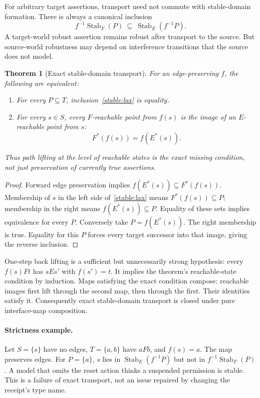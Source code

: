 \documentclass[11pt]{article}
\newtheorem{theorem}{Theorem}[section]
\newcommand{\Stab}{\operatorname{Stab}}
\begin{document}
For arbitrary target assertions, transport need not commute with stable-domain formation. There is always a canonical inclusion
\begin{equation}\label{stable:lax}
 f^{-1}\Stab_F(P)\ \subseteq\ \Stab_E(f^{-1}P).
\end{equation}
A target-world robust assertion remains robust after transport to the source. But source-world robustness may depend on interference transitions that the source does not model.

\begin{theorem}[Exact stable-domain transport]\label{stable:transport}
For an edge-preserving $f$, the following are equivalent:
\begin{enumerate}
\item For every $P\subseteq T$, inclusion~\eqref{stable:lax} is equality.
\item For every $s\in S$, every $F$-reachable point from $f(s)$ is the image of an $E$-reachable point from $s$:
\[
 F^*(f(s))=f(E^*(s)).
\]
\end{enumerate}
Thus path lifting at the level of reachable states is the exact missing condition, not just preservation of currently true assertions.
\end{theorem}
\begin{proof}
Forward edge preservation implies $f(E^*(s))\subseteq F^*(f(s))$. Membership of $s$ in the left side of~\eqref{stable:lax} means $F^*(f(s))\subseteq P$; membership in the right means $f(E^*(s))\subseteq P$. Equality of these sets implies equivalence for every $P$. Conversely take $P=f(E^*(s))$. The right membership is true. Equality for this $P$ forces every target successor into that image, giving the reverse inclusion.
\end{proof}

One-step back lifting is a sufficient but unnecessarily strong hypothesis: every $f(s)Ft$ has $sEs'$ with $f(s')=t$. It implies the theorem's reachable-state condition by induction. Maps satisfying the exact condition compose: reachable images first lift through the second map, then through the first. Their identities satisfy it. Consequently exact stable-domain transport is closed under pure interface-map composition.

\paragraph{Strictness example.} Let $S=\{s\}$ have no edges, $T=\{a,b\}$ have $aFb$, and $f(s)=a$. The map preserves edges. For $P=\{a\}$, $s$ lies in $\Stab_E(f^{-1}P)$ but not in $f^{-1}\Stab_F(P)$. A model that omits the reset action thinks a suspended permission is stable. This is a failure of exact transport, not an issue repaired by changing the receipt's type name.
\end{document}
